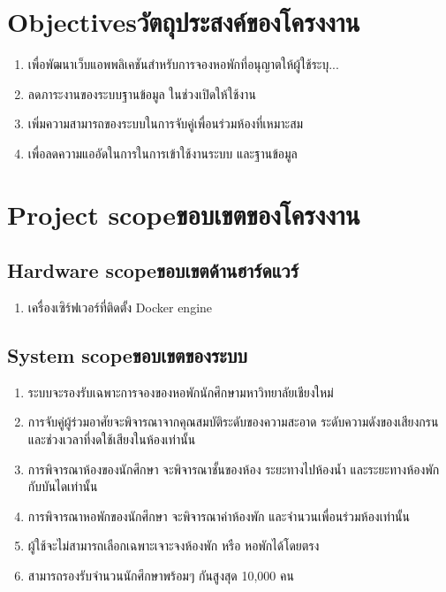 \section{\ifenglish Objectives\else วัตถุประสงค์ของโครงงาน\fi}
\begin{enumerate}
    \item เพื่อพัฒนาเว็บแอพพลิเคชันสำหรับการจองหอพักที่อนุญาตให้ผู้ใช้ระบุ...
    \item ลดภาระงานของระบบฐานข้อมูล ในช่วงเปิดให้ใช้งาน
    \item เพิ่มความสามารถของระบบในการจับคู่เพื่อนร่วมห้องที่เหมาะสม
    \item เพื่อลดความแออัดในการในการเข้าใช้งานระบบ และฐานข้อมูล
\end{enumerate}

\section{\ifenglish Project scope\else ขอบเขตของโครงงาน\fi}
\subsection{\ifenglish Hardware scope\else ขอบเขตด้านฮาร์ดแวร์\fi}
\begin{enumerate}
    \item เครื่องเซิร์ฟเวอร์ที่ติดตั้ง Docker engine
\end{enumerate}
\subsection{\ifenglish System scope\else ขอบเขตของระบบ\fi}
\begin{enumerate}
    \item ระบบจะรองรับเฉพาะการจองของหอพักนักศึกษามหาวิทยาลัยเชียงใหม่
    \item การจับคู่ผู้ร่วมอาศัยจะพิจารณาจากคุณสมบัติระดับของความสะอาด
          ระดับความดังของเสียงกรน และช่วงเวลาที่งดใช้เสียงในห้องเท่านั้น
    \item การพิจารณาห้องของนักศึกษา จะพิจารณาชั้นของห้อง ระยะทางไปห้องน้ำ และระยะทางห้องพักกับบันไดเท่านั้น
    \item การพิจารณาหอพักของนักศึกษา จะพิจารณาค่าห้องพัก และจำนวนเพื่อนร่วมห้องเท่านั้น
    \item ผู้ใช้จะไม่สามารถเลือกเฉพาะเจาะจงห้องพัก หรือ หอพักได้โดยตรง
    \item สามารถรองรับจำนวนนักศึกษาพร้อมๆ กันสูงสุด 10,000 คน
\end{enumerate}

